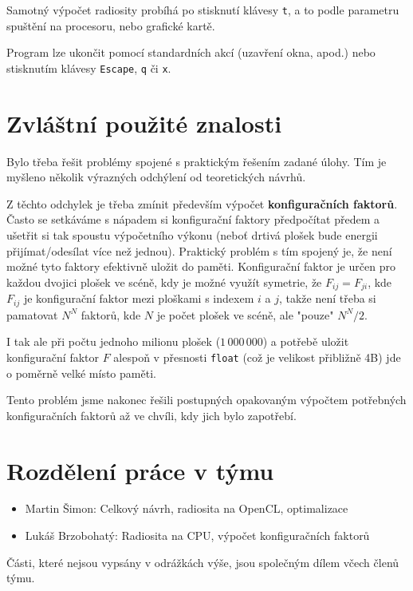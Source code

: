 \documentclass[11pt,a4paper]{article}
\begin{document}
Samotný výpočet radiosity probíhá po stisknutí klávesy \texttt{t}, a to podle parametru spuštění na procesoru, nebo grafické kartě.

Program lze ukončit pomocí standardních akcí (uzavření okna, apod.) nebo stisknutím klávesy \texttt{Escape}, \texttt{q} či \texttt{x}.


\section{Zvláštní použité znalosti}
Bylo třeba řešit problémy spojené s praktickým řešením zadané úlohy. Tím je myšleno několik výrazných odchýlení od teoretických návrhů.

Z těchto odchylek je třeba zmínit především výpočet \textbf{konfiguračních faktorů}. Často se setkáváme s nápadem si konfigurační faktory předpočítat předem a ušetřit si tak spoustu výpočetního výkonu (neboť drtivá plošek bude energii přijímat/odesílat více než jednou). Praktický problém s tím spojený je, že není možné tyto faktory efektivně uložit do paměti. Konfigurační faktor je určen pro každou dvojici plošek ve scéně, kdy je možné využít symetrie, že $F_{ij} = F_{ji}$, kde $F_{ij}$ je konfigurační faktor mezi ploškami s indexem $i$ a $j$, takže není třeba si pamatovat $N^N$ faktorů, kde $N$ je počet plošek ve scéně, ale "pouze" $N^N/2$.

I tak ale při počtu jednoho milionu plošek ($1\,000\,000$) a potřebě uložit konfigurační faktor $F$ alespoň v přesnosti \texttt{float} (což je velikost přibližně 4B) jde o poměrně velké místo paměti.

Tento problém jsme nakonec řešili postupných opakovaným výpočtem potřebných konfiguračních faktorů až ve chvíli, kdy jich bylo zapotřebí.

\section{Rozdělení práce v týmu}

\begin{itemize}
\item Martin Šimon: Celkový návrh, radiosita na OpenCL, optimalizace
\item Lukáš Brzobohatý: Radiosita na CPU, výpočet konfiguračních faktorů
\end{itemize}

Části, které nejsou vypsány v odrážkách výše, jsou společným dílem včech členů týmu.
\end{document}
